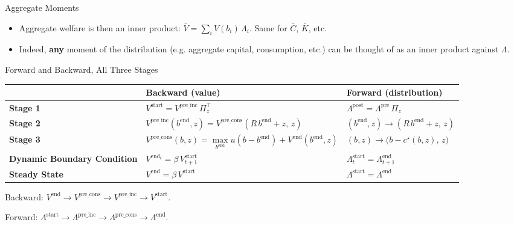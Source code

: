 \documentclass[10pt,aspectratio=169]{beamer}
\begin{document}
\begin{frame}{Aggregate Moments}
  \begin{itemize}
    \item Aggregate welfare is then an inner product: $\bar{V} = \sum_i V(b_i) \, \Lambda_i$. Same for $\bar{C}$, $\bar{K}$, etc.
    \item Indeed, \textbf{any} moment of the distribution (e.g. aggregate capital, consumption, etc.) can be thought of as an inner product against $\Lambda$.
  \end{itemize}
\end{frame}

\begin{frame}{Forward and Backward, All Three Stages}
  \footnotesize
  \setlength{\tabcolsep}{6pt}
  \renewcommand{\arraystretch}{1.45}
  \begin{tabular}{@{}l l l@{}}
  \toprule
  & \textbf{Backward} (value) & \textbf{Forward} (distribution) \\
  \midrule
  \textbf{Stage 1}    & $V^{\mathrm{start}} = V^{\mathrm{pre\_inc}}\, \Pi_z^\top$
                      & $\Lambda^{\mathrm{post}} = \Lambda^{\mathrm{pre}}\, \Pi_z$ \\
  \textbf{Stage 2}    & $V^{\mathrm{pre\_inc}}(b^{\mathrm{end}}, z) = V^\text{pre\_cons}(R\, b^{\mathrm{end}} + z,\, z)$
                      & $(b^{\mathrm{end}}, z) \to (R\, b^{\mathrm{end}} + z,\, z)$ \\
  \textbf{Stage 3}    & $V^\text{pre\_cons}(b, z) = \max\limits_{b^{\mathrm{end}}} u(b - b^{\mathrm{end}}) + V^{\mathrm{end}}(b^{\mathrm{end}}, z)$
                      & $(b, z) \to \big(b - c^\star(b, z),\, z\big)$ \\
  \midrule
  \textbf{Dynamic Boundary Condition}   & $V^{\mathrm{end}_t} = \beta\, V^{\mathrm{start}}_{t+1}$
                      & $\Lambda^\text{start}_t = \Lambda^\text{end}_{t+1}$ \\
  \textbf{Steady State}   & $V^{\mathrm{end}} = \beta\, V^{\mathrm{start}}$
                      & $\Lambda^\text{start} = \Lambda^\text{end}$ \\
  \bottomrule
  \end{tabular}

  \vspace{0.8em}

  \footnotesize
  Backward: $V^{\mathrm{end}} \to V^\text{pre\_cons} \to V^{\mathrm{pre\_inc}} \to V^{\mathrm{start}}$.

  Forward: $\Lambda^\text{start} \to \Lambda^\text{pre\_inc} \to \Lambda^\text{pre\_cons} \to \Lambda^\text{end}$.
\end{frame}
\end{document}
